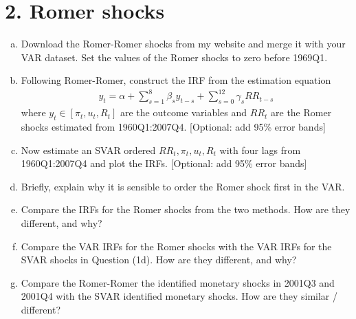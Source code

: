 \documentclass{article}
\newcommand{\1}{\mathbf{1}}
\begin{document}
\section*{2. Romer shocks}
\begin{enumerate}[(a)]
	\item Download the Romer-Romer shocks from my website and merge it with your VAR dataset. Set the values of the Romer shocks to zero before 1969Q1.
	\item Following Romer-Romer, construct the IRF from the estimation equation
	\begin{align*}
		y_t = \alpha + \sum_{s=1}^{8}\beta_s y_{t-s} + \sum_{s=0}^{12}\gamma_{s}RR_{t-s}
	\end{align*}
	where $y_t\in[\pi_t,u_t,R_t]$ are the outcome variables and $RR_t$ are the Romer shocks estimated from 1960Q1:2007Q4. [Optional: add 95\% error bands]
	\item Now estimate an SVAR ordered $RR_t,\pi_t,u_t,R_t$ with four lags from 1960Q1:2007Q4 and plot the IRFs. [Optional: add 95\% error bands]
	\item Briefly, explain why it is sensible to order the Romer shock first in the VAR.
	\item Compare the IRFs for the Romer shocks from the two methods. How are they different, and why?
	\item Compare the VAR IRFs for the Romer shocks with the VAR IRFs for the SVAR shocks in Question (1d). How are they different, and why?
	\item Compare the Romer-Romer the identified monetary shocks in 2001Q3 and 2001Q4 with the SVAR identified monetary shocks. How are they similar / different?
\end{enumerate}
\end{document}
